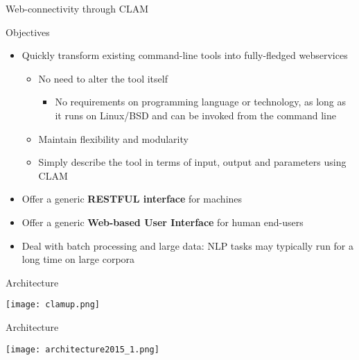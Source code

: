 \documentclass[xcolor=table,10pt,t]{beamer}
\begin{document}
\begin{frame}{Web-connectivity through CLAM}
  \begin{block}{Objectives}
      \begin{itemize}
        \item Quickly transform existing command-line tools into fully-fledged webservices
        \begin{itemize}
            \item No need to alter the tool itself
            \begin{itemize}
                \item \footnotesize{No requirements on programming language or technology, as
                long as it runs on Linux/BSD and can be invoked from the command line}
            \end{itemize}
            \item Maintain flexibility and modularity
            \item Simply describe the tool in terms of input, output and
                parameters using CLAM
        \end{itemize}
        \item Offer a generic \textbf{RESTFUL interface} for machines
        \item Offer a generic \textbf{Web-based User Interface} for human end-users
        \item Deal with batch processing and large data: NLP tasks may typically run for a
            long time on large corpora
      \end{itemize}
  \end{block}
\end{frame}


\begin{frame}{Architecture}

    \begin{center}
    \texttt{[image: clamup.png]}
    \end{center}

\end{frame}


\begin{frame}{Architecture}

    \begin{center}
    \texttt{[image: architecture2015\_1.png]}
    \end{center}

\end{frame}
\end{document}
